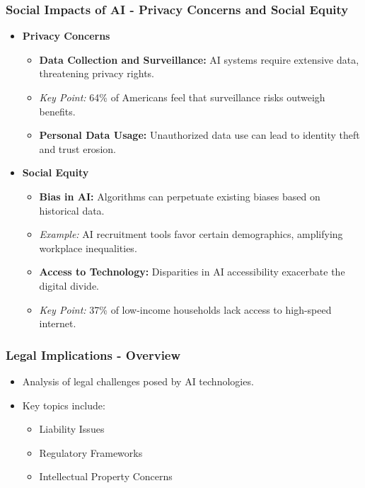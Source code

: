 \documentclass[aspectratio=169]{beamer}
\begin{document}
\begin{frame}[fragile]
    \frametitle{Social Impacts of AI - Privacy Concerns and Social Equity}
    \begin{itemize}
        \item \textbf{Privacy Concerns}
        \begin{itemize}
            \item \textbf{Data Collection and Surveillance:} AI systems require extensive data, threatening privacy rights.
            \item \textit{Key Point:} 64\% of Americans feel that surveillance risks outweigh benefits.
            \item \textbf{Personal Data Usage:} Unauthorized data use can lead to identity theft and trust erosion.
        \end{itemize}
        \item \textbf{Social Equity}
        \begin{itemize}
            \item \textbf{Bias in AI:} Algorithms can perpetuate existing biases based on historical data.
            \item \textit{Example:} AI recruitment tools favor certain demographics, amplifying workplace inequalities.
            \item \textbf{Access to Technology:} Disparities in AI accessibility exacerbate the digital divide.
            \item \textit{Key Point:} 37\% of low-income households lack access to high-speed internet.
        \end{itemize}
    \end{itemize}
\end{frame}

\begin{frame}[fragile]
    \frametitle{Legal Implications - Overview}
    \begin{itemize}
        \item Analysis of legal challenges posed by AI technologies.
        \item Key topics include:
        \begin{itemize}
            \item Liability Issues
            \item Regulatory Frameworks
            \item Intellectual Property Concerns
        \end{itemize}
    \end{itemize}
\end{frame}
\end{document}

